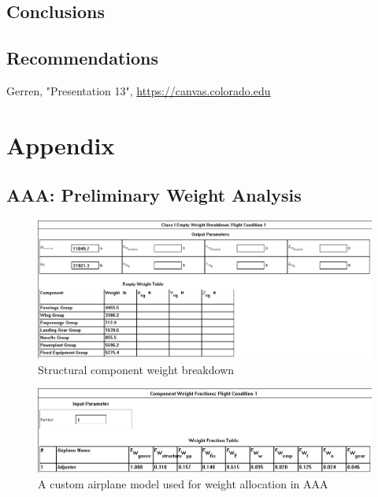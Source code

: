 \documentclass[conf]{new-aiaa}
\begin{document}
\subsection{Conclusions}

\subsection{Recommendations}

\begin{thebibliography}{99}


 Gerren, "Presentation 13", \url{https://canvas.colorado.edu}

\end{thebibliography}

\section{Appendix}

\subsection{AAA: Preliminary Weight Analysis}
\begin{figure}[H]
    \includegraphics[width=\textwidth]{Report3Printouts/Weight/ComponentWeights_cropped.png}
    \caption{Structural component weight breakdown}
    \label{fig:componentweights}
\end{figure}

\begin{figure}[H]
    \includegraphics[width=\textwidth]{Report3Printouts/Weight/CustomAirplane_cropped.png}
    \caption{A custom airplane model used for weight allocation in AAA}
    \label{fig:customairplane}
\end{figure}
\end{document}
